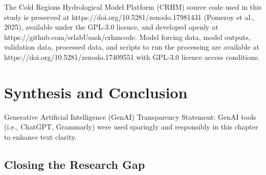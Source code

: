 \documentclass[
  letterpaper,
]{tex/uofsthesis-cs}
\begin{document}
The Cold Regions Hydrological Model Platform (CRHM) source code used in
this study is preserved at https://doi.org/10.5281/zenodo.17981431
(Pomeroy et al., 2025), available under the GPL-3.0 licence, and
developed openly at https://github.com/srlabUsask/crhmcode. Model
forcing data, model outputs, validation data, processed data, and
scripts to run the processing are available at
https://doi.org/10.5281/zenodo.17409551 with GPL-3.0 licence access
conditions.


\chapter{Synthesis and Conclusion}\label{synthesis-and-conclusion}

Generative Artificial Intelligence (GenAI) Transparency Statement: GenAI
tools (i.e., ChatGPT, Grammarly) were used sparingly and responsibly in
this chapter to enhance text clarity.

\section{Closing the Research Gap}\label{closing-the-research-gap}
\end{document}
